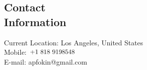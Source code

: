 \documentclass[margin,line]{CV}
\begin{document}
\begin{resume}


    \section{\mysidestyle Contact\\Information}
    Current Location: Los Angeles, United States \\
    Mobile: \includegraphics[height=0.35cm]{phone-us.png} \\ 
    E-mail: apfokin@gmail.com 


    


\end{resume}
\end{document}
